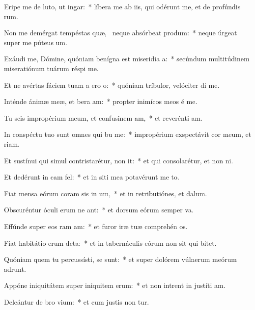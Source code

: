 \item Eripe me de luto, ut  ingar:~* líbera me ab iis, qui odérunt me, et de profúndis rum.
\item Non me demérgat tempéstas quæ,~\pscross{} neque absórbeat  produm:~* neque úrgeat super me púteus  um.
\item Exáudi me, Dómine, quóniam benígna est miseridia a:~* secúndum multitúdinem miseratiónum tuárum réspi  me.
\item Et ne avértas fáciem tuam a ero o:~* quóniam tríbulor, velóciter di me.
\item Inténde ánimæ meæ, et bera am:~* propter inimícos meos é me.
\item Tu scis impropérium meum, et confusinem am,~* et reverénti am.
\item In conspéctu tuo sunt omnes qui bu me:~* impropérium exspectávit cor meum, et riam.
\item Et sustínui qui simul contristarétur,  non it:~* et qui consolarétur, et non ni.
\item Et dedérunt in cam  fel:~* et in siti mea potavérunt me to.
\item Fiat mensa eórum coram sis in um,~* et in retributiónes, et  dalum.
\item Obscuréntur óculi erum ne ant:~* et dorsum eórum semper va.
\item Effúnde super eos ram am:~* et furor iræ tuæ comprehén os.
\item Fiat habitátio erum deta:~* et in tabernáculis eórum non sit qui bitet.
\item Quóniam quem tu percussísti, se sunt:~* et super dolórem vúlnerum meórum adrunt.
\item Appóne iniquitátem super iniquitem erum:~* et non intrent in justíti am.
\item Deleántur de bro vium:~* et cum justis non tur.
